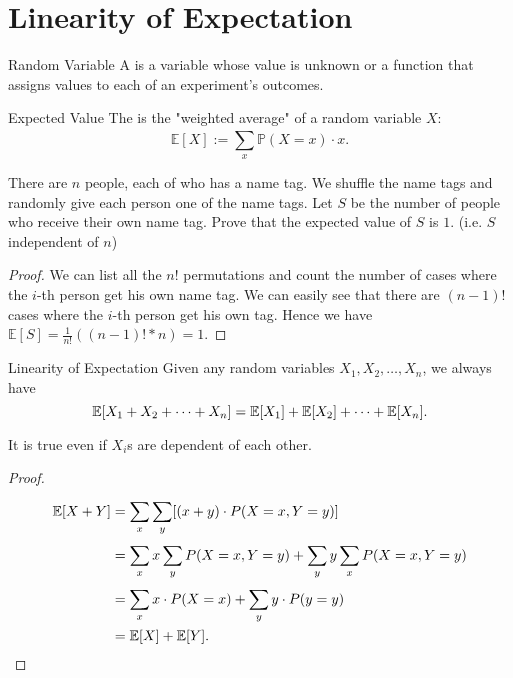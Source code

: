 \section{Linearity of Expectation}

\begin{definition}[def:]{Random Variable}
    A  is a variable whose value is unknown or a function that assigns values to each of an experiment's outcomes.
\end{definition}

\begin{definition}[def:]{Expected Value}
    The  is the "weighted average" of a random variable $X$:
    \[\mathbb{E}[X]:=\sum_{x}^{}\mathbb{P}(X=x)\cdot x.\]
\end{definition}

\begin{example}[exp:]{}
    There are $n$ people, each of who has a name tag. We shuffle the name tags and randomly give each person one of the name tags. Let $S$ be the number of people who receive their own name tag. Prove that the expected value of $S$ is $1$. (i.e. $S$ independent of $n$)
\end{example}

\begin{proof}
    We can list all the $n!$ permutations and count the number of cases where the $i$-th person get his own name tag. We can easily see that there are $(n-1)!$ cases where the $i$-th person get his own tag. Hence we have
    $\mathbb{E}[S]=\frac{1}{n!}\left((n-1)!*n\right)=1$.
\end{proof}

\begin{theorem}[thm:]{Linearity of Expectation}
    Given any random variables $X_1,X_2,\dots ,X_n$, we always have
    \[\mathbb{E}[X_1+X_2+\cdots +X_n]=\mathbb{E}[X_1]+\mathbb{E}[X_2]+\cdots +\mathbb{E}[X_n].\]
\end{theorem}

\begin{remark}
    It is true even if $X_i$s are dependent of each other.
\end{remark}

\begin{proof}
    \begin{alignat*}{1}
        \mathbb{E}[X+Y]&= \sum_{x}^{}\sum_{y}^{}[(x+y)\cdot P(X=x,Y=y)]\\
                &= \sum_{x}^{}x\sum_{y}^{}P(X=x,Y=y)+\sum_{y}^{}y\sum_{x}^{}P(X=x,Y=y)\\
                &= \sum_{x}^{}x\cdot P(X=x)+\sum_{y}^{}y\cdot P(y=y)\\
                &= \mathbb{E}[X]+\mathbb{E}[Y].
    \end{alignat*}
\end{proof}

